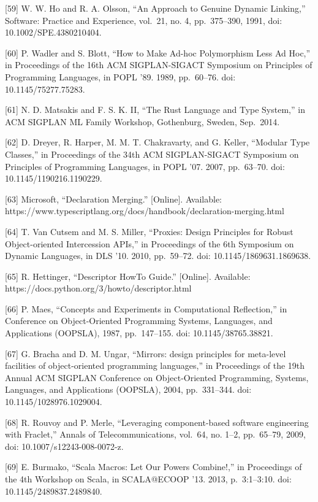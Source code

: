 {[}59{]} W. W. Ho and R. A. Olsson, ``An Approach to Genuine Dynamic Linking,''
Software: Practice and Experience, vol.~21, no. 4, pp.~375--390, 1991, doi:
10.1002/SPE.4380210404.

{[}60{]} P. Wadler and S. Blott, ``How to Make Ad-hoc Polymorphism Less Ad Hoc,'' in
Proceedings of the 16th ACM SIGPLAN-SIGACT Symposium on Principles of Programming
Languages, in POPL '89. 1989, pp.~60--76. doi: 10.1145/75277.75283.

{[}61{]} N. D. Matsakis and F. S. K. II, ``The Rust Language and Type System,'' in
ACM SIGPLAN ML Family Workshop, Gothenburg, Sweden, Sep.~2014.

{[}62{]} D. Dreyer, R. Harper, M. M. T. Chakravarty, and G. Keller, ``Modular Type
Classes,'' in Proceedings of the 34th ACM SIGPLAN-SIGACT Symposium on Principles of
Programming Languages, in POPL '07. 2007, pp.~63--70. doi: 10.1145/1190216.1190229.

{[}63{]} Microsoft, ``Declaration Merging.'' {[}Online{]}. Available:
https://www.typescriptlang.org/docs/handbook/declaration-merging.html

{[}64{]} T. Van Cutsem and M. S. Miller, ``Proxies: Design Principles for Robust
Object-oriented Intercession APIs,'' in Proceedings of the 6th Symposium on Dynamic
Languages, in DLS '10. 2010, pp.~59--72. doi: 10.1145/1869631.1869638.

{[}65{]} R. Hettinger, ``Descriptor HowTo Guide.'' {[}Online{]}. Available:
https://docs.python.org/3/howto/descriptor.html

{[}66{]} P. Maes, ``Concepts and Experiments in Computational Reflection,'' in
Conference on Object-Oriented Programming Systems, Languages, and Applications
(OOPSLA), 1987, pp.~147--155. doi: 10.1145/38765.38821.

{[}67{]} G. Bracha and D. M. Ungar, ``Mirrors: design principles for meta-level
facilities of object-oriented programming languages,'' in Proceedings of the 19th
Annual ACM SIGPLAN Conference on Object-Oriented Programming, Systems, Languages,
and Applications (OOPSLA), 2004, pp.~331--344. doi: 10.1145/1028976.1029004.

{[}68{]} R. Rouvoy and P. Merle, ``Leveraging component-based software engineering
with Fraclet,'' Annals of Telecommunications, vol.~64, no. 1--2, pp.~65--79, 2009,
doi: 10.1007/s12243-008-0072-z.

{[}69{]} E. Burmako, ``Scala Macros: Let Our Powers Combine!,'' in Proceedings of
the 4th Workshop on Scala, in SCALA@ECOOP '13. 2013, p.~3:1--3:10. doi:
10.1145/2489837.2489840.

